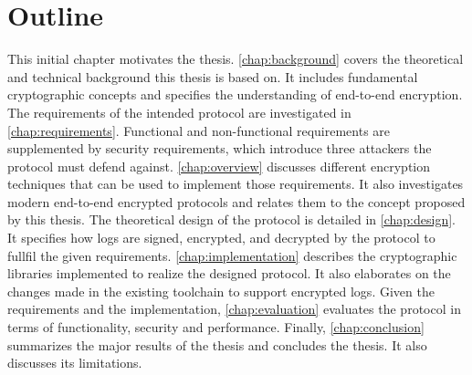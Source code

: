 \documentclass[../main.tex]{subfiles}
\begin{document}
\section{Outline}
This initial chapter motivates the thesis.
\cref{chap:background} covers the theoretical and technical background this thesis is based on.
It includes fundamental cryptographic concepts and specifies the understanding of end-to-end encryption.
The requirements of the intended protocol are investigated in \cref{chap:requirements}.
Functional and non-functional requirements are supplemented by security requirements, which introduce three attackers the protocol must defend against.
\cref{chap:overview} discusses different encryption techniques that can be used to implement those requirements.
It also investigates modern end-to-end encrypted protocols and relates them to the concept proposed by this thesis.
The theoretical design of the protocol is detailed in \cref{chap:design}.
It specifies how logs are signed, encrypted, and decrypted by the protocol to fullfil the given requirements.
\cref{chap:implementation} describes the cryptographic libraries implemented to realize the designed protocol.
It also elaborates on the changes made in the existing toolchain to support encrypted logs.
Given the requirements and the implementation, \cref{chap:evaluation} evaluates the protocol in terms of functionality, security and performance.
Finally, \cref{chap:conclusion} summarizes the major results of the thesis and concludes the thesis. 
It also discusses its limitations.
\end{document}
